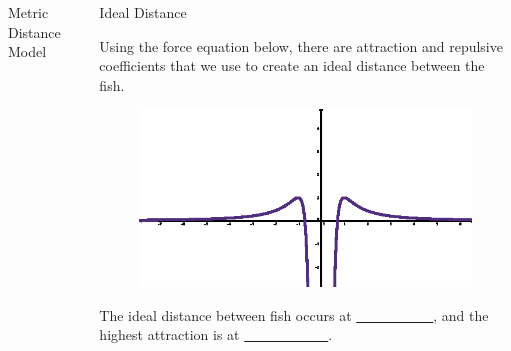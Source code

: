 \documentclass[final, xcolor=dvipsnames]{beamer}
\newlength{\onecolwid}
\newlength{\twocolwid}
\begin{document}
\begin{frame}[t]
\begin{columns}[t]
\begin{column}{\twocolwid}
\begin{columns}[t,totalwidth=\twocolwid]
\begin{column}{\onecolwid}
\begin{block}{Metric Distance Model}
\begin{figure}
	\centering
\end{figure}

\end{block}


\end{column} %

\begin{column}{\onecolwid}\vspace{-.6in} %


\begin{block}{Ideal Distance}

Using the force equation below, there are attraction and repulsive coefficients that we use to create an ideal distance between the fish. 
\begin{figure}
	\centering
	\includegraphics[scale=3]{coeff_plot2.eps}
\end{figure}
The ideal distance between fish occurs at \underline{~~~~~~~~~~~}, and the highest attraction is at \underline{~~~~~~~~~~~~}.


\end{block}
\end{column}
\end{columns}
\end{column}
\end{columns}
\end{frame}
\end{document}

